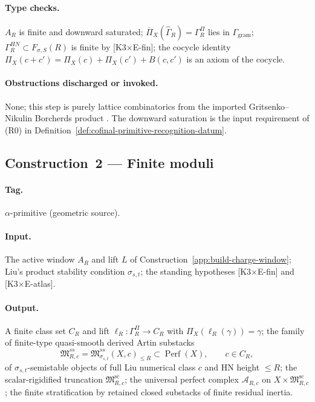 \paragraph{Type checks.}
\(A_R\) is finite and downward saturated;
\(\overline\Pi_X(\widehat\Gamma_R)=\Gamma_R^\Pi\) lies in
\(\Gamma_{\mathrm{gram}}\); \(\Gamma_R^{HN}\subset
F_{\sigma,S}(R)\) is finite by \textup{[K3$\times$E-fin]}; the cocycle
identity
\(\Pi_X(c+c')=\Pi_X(c)+\Pi_X(c')+B(c,c')\) is an axiom of the cocycle.

\paragraph{Obstructions discharged or invoked.}
None; this step is purely lattice combinatorics from the imported
Gritsenko--Nikulin Borcherds product
\cite{GN,GNPartI,GNII,BorcherdsGKM88,Borcherds95}.
The downward saturation is the input requirement of \textup{(R0)} in
Definition~\ref{def:cofinal-primitive-recognition-datum}.

\subsection{Construction~2 — Finite moduli}
\label{app:build-finite-moduli}

\paragraph{Tag.} \(\alpha\)-primitive (geometric source).

\paragraph{Input.}
The active window \(A_R\) and lift \(L\) of
Construction~\ref{app:build-charge-window}; Liu's product stability
condition \(\sigma_{s,t}\); the standing hypotheses
\textup{[K3$\times$E-fin]} and \textup{[K3$\times$E-atlas]}.

\paragraph{Output.}
A finite class set \(C_R\) and lift
\(\ell_R:\Gamma_R^\Pi\to C_R\) with
\(\Pi_X(\ell_R(\gamma))=\gamma\); the family of finite-type quasi-smooth
derived Artin substacks
\[
\mathfrak M^{ss}_{R,c}
=\mathfrak M^{ss}_{\sigma_{s,t}}(X,c)_{\le R}
\subset\operatorname{Perf}(X),
\qquad c\in C_R,
\]
of \(\sigma_{s,t}\)-semistable objects of full Liu numerical class
\(c\) and HN height \(\le R\); the scalar-rigidified truncation
\(\mathfrak M^{\mathrm{sc}}_{R,c}\); the universal perfect complex
\(\mathcal A_{R,c}\) on \(X\times\mathfrak M^{\mathrm{sc}}_{R,c}\); the
finite stratification by retained closed substacks of finite residual
inertia.

